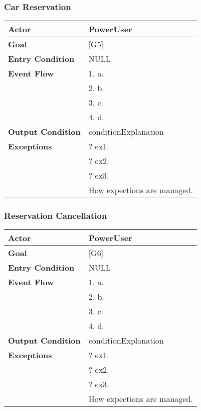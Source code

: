 \subsubsection{Car Reservation}
\begin{tabular}{| l | p{8cm} |}
\hline
\textbf{Actor}      &       PowerUser \\
\hline
\textbf{Goal}       &       [G5]\\
\hline
\textbf{Entry Condition} &  NULL\\
\hline
\textbf{Event Flow}     &   1.	a.\\&
                                            2.	b.\\&
                                            3.	c.\\&
                                            4.  d.\\
\hline
\textbf{Output Condition} & conditionExplanation\\
\hline
\textbf{Exceptions} &       ?   ex1.\\& 
                            ?	ex2.\\&
                            ?	ex3.\\& 
                           How expections are managed.\\
\hline
\end{tabular} 


\subsubsection{Reservation Cancellation}
\begin{tabular}{| l | p{8cm} |}
\hline
\textbf{Actor}      &       PowerUser \\
\hline
\textbf{Goal}       &       [G6]\\
\hline
\textbf{Entry Condition} &  NULL\\
\hline
\textbf{Event Flow}     &   1.	a.\\&
                                            2.	b.\\&
                                            3.	c.\\&
                                            4.  d.\\
\hline
\textbf{Output Condition} & conditionExplanation\\
\hline
\textbf{Exceptions} &       ?   ex1.\\& 
                            ?	ex2.\\&
                            ?	ex3.\\& 
                           How expections are managed.\\
\hline
\end{tabular} 


